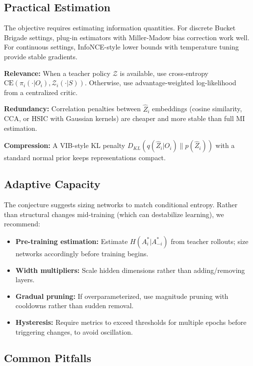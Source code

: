 \documentclass[10pt, letterpaper]{article}
\begin{document}
\subsection{Practical Estimation}

The objective requires estimating information quantities. For discrete Bucket Brigade settings, plug-in estimators with Miller-Madow bias correction work well. For continuous settings, InfoNCE-style lower bounds with temperature tuning provide stable gradients.

\textbf{Relevance:} When a teacher policy $\mathcal{Z}$ is available, use cross-entropy $\text{CE}(\pi_i(\cdot|O_i), \mathcal{Z}_i(\cdot|S))$. Otherwise, use advantage-weighted log-likelihood from a centralized critic.

\textbf{Redundancy:} Correlation penalties between $\hat{Z}_i$ embeddings (cosine similarity, CCA, or HSIC with Gaussian kernels) are cheaper and more stable than full MI estimation.

\textbf{Compression:} A VIB-style KL penalty $D_{KL}(q(\hat{Z}_i|O_i) \| p(\hat{Z}_i))$ with a standard normal prior keeps representations compact.

\subsection{Adaptive Capacity}

The conjecture suggests sizing networks to match conditional entropy. Rather than structural changes mid-training (which can destabilize learning), we recommend:
\begin{itemize}
    \item \textbf{Pre-training estimation:} Estimate $H(A_i^*|A_{-i}^*)$ from teacher rollouts; size networks accordingly before training begins.
    \item \textbf{Width multipliers:} Scale hidden dimensions rather than adding/removing layers.
    \item \textbf{Gradual pruning:} If overparameterized, use magnitude pruning with cooldowns rather than sudden removal.
    \item \textbf{Hysteresis:} Require metrics to exceed thresholds for multiple epochs before triggering changes, to avoid oscillation.
\end{itemize}

\subsection{Common Pitfalls}
\end{document}
